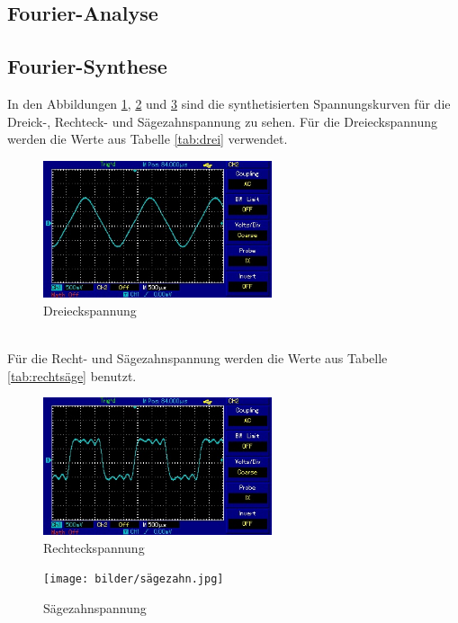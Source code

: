 \subsection{Fourier-Analyse}



\subsection{Fourier-Synthese}
In den Abbildungen \ref{fig:drei}, \ref{fig:recht} und \ref{fig:säge} sind die synthetisierten
Spannungskurven für die Dreick-, Rechteck- und Sägezahnspannung zu sehen.
Für die Dreieckspannung werden die Werte aus Tabelle \ref{tab:drei} verwendet.

\begin{figure}
  \centering
  \includegraphics[width=0.6\textwidth]{bilder/dreieck.jpg}
  \caption{Dreieckspannung}
  \label{fig:drei}
\end{figure} \\

Für die Recht- und Sägezahnspannung werden die Werte aus Tabelle \ref{tab:rechtsäge}
benutzt.

\begin{figure}
  \centering
  \includegraphics[width=0.6\textwidth]{bilder/rechteck.jpg}
  \caption{Rechteckspannung}
  \label{fig:recht}
\end{figure}

\begin{figure}
  \centering
  \texttt{[image: bilder/sägezahn.jpg]}
  \caption{Sägezahnspannung}
  \label{fig:säge}
\end{figure}
